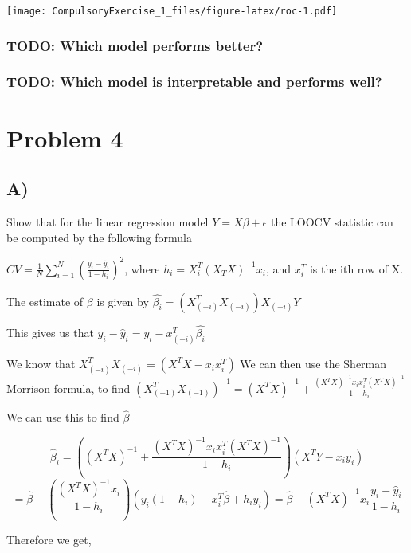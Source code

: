 \documentclass[
]{article}
\begin{document}
\texttt{[image: CompulsoryExercise\_1\_files/figure-latex/roc-1.pdf]}

\hypertarget{todo-which-model-performs-better}{%
\subsubsection{TODO: Which model performs
better?}\label{todo-which-model-performs-better}}

\hypertarget{todo-which-model-is-interpretable-and-performs-well}{%
\subsubsection{TODO: Which model is interpretable and performs
well?}\label{todo-which-model-is-interpretable-and-performs-well}}

\hypertarget{problem-4}{%
\section{Problem 4}\label{problem-4}}

\hypertarget{a-3}{%
\subsection{A)}\label{a-3}}

Show that for the linear regression model \(Y=X\beta+\epsilon\) the
LOOCV statistic can be computed by the following formula

\(CV = \frac{1}{N}\sum^N_{i=1}(\frac{y_i - \hat{y}_i}{1-h_i})^2\), where
\(h_i=X^T_i(X_TX)^{-1}x_i\), and \(x^T_i\) is the ith row of X.

The estimate of \(\beta\) is given by
\(\hat{\beta_i}=(X^T_{(-i)}X_{(-i)})X_{(-i)}Y\)

This gives us that \(y_i-\hat{y}_i = y_i - x^T_{(-i)}\hat{\beta_i}\)

We know that \(X^T_{(-i)}X_{(-i)}=(X^TX−x_{i}x^T_i)\) We can then use
the Sherman Morrison formula, to find
\((X^T_{(-1)}X_{(-1)})^{-1} = (X^TX)^{−1}+\frac{(X^TX)^{−1}x_{i}x^T_{i}(X^TX)^{−1}}{1−h_i}\)

We can use this to find \(\hat{\beta}\)

\[\hat{\beta}_i 
= ((X^TX)^{−1}+\frac{(X^TX)^{−1}x_{i}x^T_{i}(X^TX)^{−1}}{1−h_i})(X^TY-x_iy_i)\]
\[
= \hat{\beta} - (\frac{(X^TX)^{−1}x_{i}}{1−h_i})(y_i(1-h_i)-x^T_i\hat{\beta}+h_iy_i)
=\hat{\beta}-(X^TX)^{-1}x_i\frac{y_i - \hat{y}_i}{1-h_i}
\]

Therefore we get,
\end{document}
